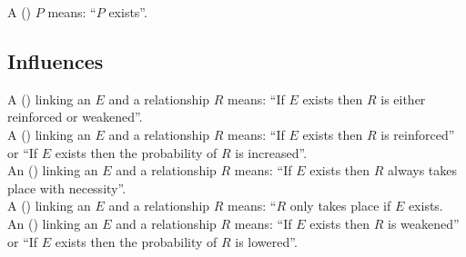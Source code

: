 \noindent
A  () $P$ means: ``$P$ exists''.\\[\baselineskip]

\subsection{Influences}

A  () linking an  $E$ and a relationship $R$ means: ``If $E$ exists then $R$ is either reinforced or weakened''. 
\\[\baselineskip]

\noindent
A  () linking an  $E$ and a relationship $R$ means: ``If $E$ exists then $R$ is reinforced'' or ``If $E$ exists then the probability of $R$ is increased''. 
\\[\baselineskip]

\noindent
An  () linking an  $E$ and a relationship $R$ means: ``If $E$ exists then $R$ always takes place with necessity''. 
\\[\baselineskip]

\noindent
A  () linking an  $E$ and a relationship $R$ means: ``$R$ only takes place if $E$ exists. 
\\[\baselineskip]

\noindent
An  () linking an  $E$ and a relationship $R$ means: ``If $E$ exists then $R$ is weakened'' or ``If $E$ exists then the probability of $R$ is lowered''. 
\\[\baselineskip]


